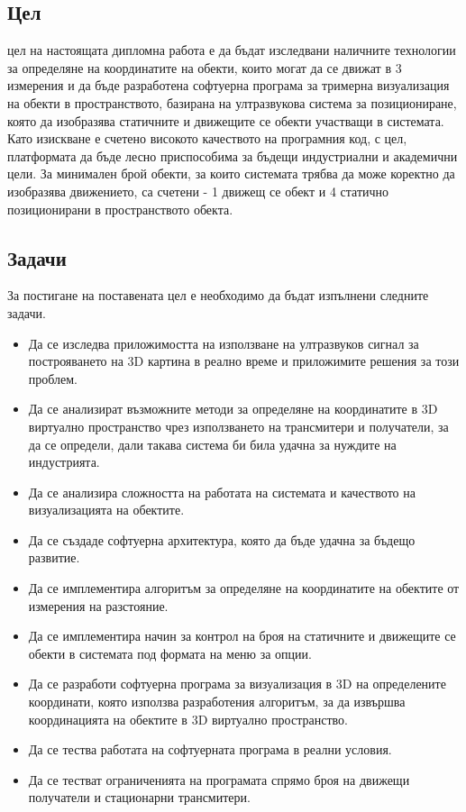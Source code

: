 \subsection{Цел}
 цел на настоящата дипломна работа е да бъдат изследвани наличните технологии за определяне на координатите на обекти, които могат да се движат в 3 измерения и да бъде разработена софтуерна програма за тримерна визуализация на обекти в пространството, базирана на ултразвукова система за позициониране, която да изобразява статичните и движещите се обекти участващи в системата. Като изискване е счетено високото качеството на програмния код, с цел, платформата да бъде лесно приспособима за бъдещи индустриални и академични цели. За минимален брой обекти, за които системата трябва да може коректно да изобразява движението, са счетени - 1 движещ се обект и 4 статично позиционирани в пространството обекта. 

\subsection{Задачи}
За постигане на поставената цел е необходимо да бъдат изпълнени следните задачи.

\begin{itemize}
    \item Да се изследва приложимостта на използване на ултразвуков сигнал за построяването на 3D картина в реално време и приложимите решения за този проблем.
      
    \item Да се анализират възможните методи за определяне на координатите в 3D виртуално пространство чрез използването на трансмитери и получатели, за да се определи, дали такава система би била удачна за нуждите на индустрията.
    
    \item Да се анализира сложността на работата на системата и качеството на визуализацията на обектите.
    
    \item Да се създаде софтуерна архитектура, която да бъде удачна за бъдещо развитие. 
    
    \item Да се имплементира алгоритъм за определяне на координатите на обектите от измерения на разстояние.
    
    \item Да се имплементира начин за контрол на броя на статичните и движещите се обекти в системата под формата на меню за опции.
    
    \item Да се разработи софтуерна програма за визуализация в 3D на определените координати, която използва разработения алгоритъм, за да извършва координацията на обектите в 3D виртуално пространство.
    
    \item Да се тества работата на софтуерната програма в реални условия.
    
    \item Да се тестват ограниченията на програмата спрямо броя на движещи получатели и стационарни трансмитери.
\end{itemize}
